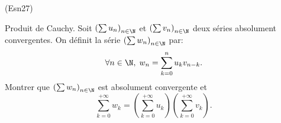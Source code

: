 \begin{tiny}(Esn27)\end{tiny} Produit de Cauchy.\newline
Soit $\left( \sum u_n \right)_{n \in \N}$ et $\left( \sum v_n \right)_{n \in \N}$ deux séries absolument convergentes. On définit la série $\left( \sum w_n \right)_{n \in \N}$ par:
\[
 \forall n \in \N,\;
 w_n = \sum_{k=0}^n u_k v_{n-k}.
\]
Montrer que $\left( \sum w_n \right)_{n \in \N}$ est absolument convergente et 
\[
 \sum_{k=0}^{+\infty}w_k = \left( \sum_{k=0}^{+\infty}u_k \right) \left( \sum_{k=0}^{+\infty}v_k \right).
\]
